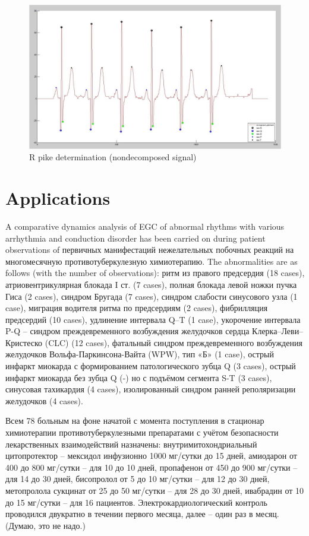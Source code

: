 \documentclass[runningheads]{AIIT}
\newcommand{\nnn}[2][rcolor]{\noindent%
\textcolor{eclr}{}\textcolor{#1}{#2}\textcolor{eclr}{}}
\begin{document}
\begin{figure}[htb]
  \centering
    \includegraphics[width=0.5\linewidth] {images/NonDecomposed.jpg}
  \caption{R pike determination (nondecomposed signal)}
  \label{fig:fig7}
\end{figure}

\section{Applications}
\label{sec:applications}

A comparative dynamics analysis of EGC of \nnn{abnormal} rhythms with various arrhythmia and conduction disorder has been carried on during patient observations of \nnn{первичных манифестаций нежелательных побочных реакций на многомесячную противотуберкулезную химиотерапию}.  The abnormalities are as follows (with the number of observations): ритм из правого предсердия (18 cases), атриовентрикулярная блокада I ст. (7 cases), полная блокада левой ножки пучка Гиса (2 cases), синдром Бругада (7 cases), синдром слабости синусового узла (1 case), миграция водителя ритма по предсердиям (2 cases), фибрилляция предсердий (10 cases), удлинение интервала Q–T (1 case), укорочение интервала P-Q – синдром  преждевременного возбуждения желудочков сердца Клерка–Леви–Кристеско (CLC) (12 cases), фатальный синдром  преждевременного возбуждения желудочков  Вольфа-Паркинсона-Вайта (WPW), тип «Б» (1 case), острый инфаркт миокарда с формированием патологического зубца Q (3 cases), острый инфаркт миокарда без зубца Q (-) но с подъёмом сегмента S-T (3 cases), синусовая тахикардия (4 cases), изолированный синдром ранней реполяризации желудочков (4 cases).

\nnn{Всем 78 больным на фоне начатой с момента поступления в стационар химиотерапии противотуберкулезными препаратами с учётом безопасности лекарственных взаимодействий назначены: внутримитохондриальный цитопротектор – мексидол инфузионно 1000 мг/сутки до 15 дней, амиодарон от 400 до 800 мг/сутки – для 10 до 10 дней, пропафенон от 450 до 900 мг/сутки – для 14 до 30 дней, бисопролол от 5 до 10 мг/сутки – для 12 до 30 дней, метопролола сукцинат от 25 до 50 мг/сутки  – для 28 до 30 дней, ивабрадин от 10 до 15 мг/сутки – для 16 пациентов. Электрокардиологический контроль проводился двукратно в течении первого месяца, далее – один раз в месяц. (Думаю, это не надо.)}
\end{document}
